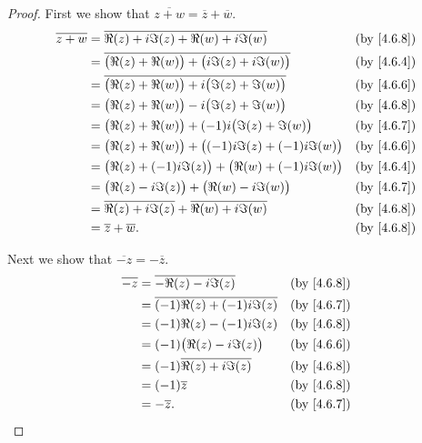 \begin{proof}
  First we show that \(\overline{z + w} = \overline{z} + \overline{w}\).
  \begin{align*}
    \overline{z + w} & = \overline{\Re(z) + i \Im(z) + \Re(w) + i \Im(w)}                     & \text{(by \cref{4.6.8})} \\
                     & = \overline{\big(\Re(z) + \Re(w)\big) + \big(i \Im(z) + i \Im(w)\big)} & \text{(by \cref{4.6.4})} \\
                     & = \overline{\big(\Re(z) + \Re(w)\big) + i \big(\Im(z) + \Im(w)\big)}   & \text{(by \cref{4.6.6})} \\
                     & = \big(\Re(z) + \Re(w)\big) - i \big(\Im(z) + \Im(w)\big)              & \text{(by \cref{4.6.8})} \\
                     & = \big(\Re(z) + \Re(w)\big) + (-1) i \big(\Im(z) + \Im(w)\big)         & \text{(by \cref{4.6.7})} \\
                     & = \big(\Re(z) + \Re(w)\big) + \big((-1) i \Im(z) + (-1) i \Im(w)\big)  & \text{(by \cref{4.6.6})} \\
                     & = \big(\Re(z) + (-1) i \Im(z)\big) + \big(\Re(w) + (-1) i \Im(w)\big)  & \text{(by \cref{4.6.4})} \\
                     & = \big(\Re(z) - i \Im(z)\big) + \big(\Re(w) - i \Im(w)\big)            & \text{(by \cref{4.6.7})} \\
                     & = \overline{\Re(z) + i \Im(z)} + \overline{\Re(w) + i \Im(w)}          & \text{(by \cref{4.6.8})} \\
                     & = \overline{z} + \overline{w}.                                         & \text{(by \cref{4.6.8})}
  \end{align*}

  Next we show that \(\overline{-z} = -\overline{z}\).
  \begin{align*}
    \overline{-z} & = \overline{-\Re(z) - i \Im(z)}          & \text{(by \cref{4.6.8})} \\
                  & = \overline{(-1) \Re(z) + (-1) i \Im(z)} & \text{(by \cref{4.6.7})} \\
                  & = (-1) \Re(z) - (-1) i \Im(z)            & \text{(by \cref{4.6.8})} \\
                  & = (-1) \big(\Re(z) - i \Im(z)\big)       & \text{(by \cref{4.6.6})} \\
                  & = (-1) \overline{\Re(z) + i \Im(z)}      & \text{(by \cref{4.6.8})} \\
                  & = (-1) \overline{z}                      & \text{(by \cref{4.6.8})} \\
                  & = -\overline{z}.                         & \text{(by \cref{4.6.7})}
  \end{align*}


\end{proof}
